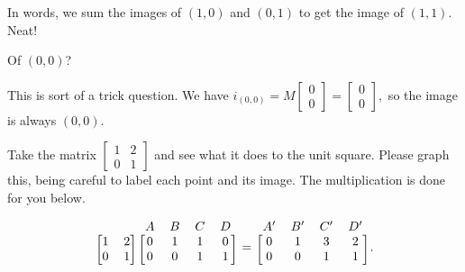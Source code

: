 \documentclass[../key.tex]{subfiles}
\begin{document}
In words, we sum the images of $(1,0)$ and $(0,1)$ to get the image of $(1,1)$. Neat!

\begin{inner_problem}
\item Of $(0,0)$?
\end{inner_problem}

This is sort of a trick question. We have $i_{(0,0)} = M\begin{bmatrix} 0 \\ 0 \end{bmatrix} = \begin{bmatrix} 0 \\ 0 \end{bmatrix},$ so the image is always $(0,0)$.

\begin{outer_problem}
\item
\end{outer_problem}

\begin{inner_problem}[start=1]
\item Take the matrix $\left[\begin{smallmatrix}1 & 2 \\ 0 & 1\end{smallmatrix}\right]$ and see what it does to the unit square. Please graph this, being careful to label each point and its image. The multiplication is done for you below.

$$\begin{blockarray}{cccccc}
& & A & B & C & D \\
\begin{block}{[cc][cccc]}
1 & 2 & 0 & 1 & 1 & 0 \\
0 & 1 & 0 & 0 & 1 & 1 \\
\end{block}
\end{blockarray} =
\begin{blockarray}{cccc}
A' & B' & C' & D' \\
\begin{block}{[cccc]}
0 & 1 & 3 & 2 \\
0 & 0 & 1 & 1 \\
\end{block}
\end{blockarray}.$$
\end{inner_problem}
\end{document}
